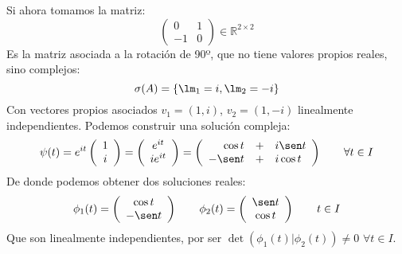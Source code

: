 \begin{ejemplo}
    Si ahora tomamos la matriz:
    \begin{equation*}
        \left(\begin{array}{cc}
                0 & 1 \\
                -1 & 0
        \end{array}\right) \in \mathbb{R}^{2\times 2}
    \end{equation*}
    Es la matriz asociada a la rotación de 90º, que no tiene valores propios reales, sino complejos:
    \begin{equation*}
        \sigma(A) = \{\lm_1 = i, \lm_2 = -i\}
    \end{equation*}
    Con vectores propios asociados $v_1=(1,i)$, $v_2=(1,-i)$ linealmente independientes. Podemos construir una solución compleja:
    \begin{equation*}
        \psi(t) = e^{it} 
        \left(\begin{array}{c}
                1\\
                i
        \end{array}\right) = 
        \left(\begin{array}{c}
                e^{it} \\
                ie^{it}
        \end{array}\right) = 
        \left(\begin{array}{rcl}
                \cos t &+& i\sen t \\
                -\sen t &+& i\cos t
        \end{array}\right) \qquad \forall t\in I
    \end{equation*}
    De donde podemos obtener dos soluciones reales:
    \begin{equation*}
        \phi_1(t) = \left(\begin{array}{c}
            \cos t\\
            -\sen t
        \end{array}\right) \qquad 
        \phi_2(t) = \left(\begin{array}{c}
            \sen t\\
            \cos t
        \end{array}\right) \qquad t\in I
    \end{equation*}
    Que son linealmente independientes, por ser $\det(\phi_1(t)|\phi_2(t))\neq 0$ $\forall t\in I$.\\



\end{ejemplo}
